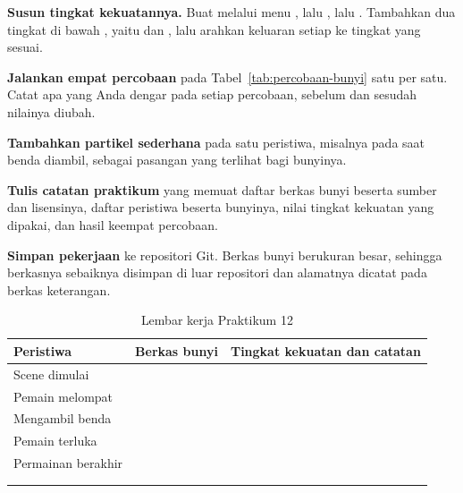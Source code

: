 \begin{praktikumbox}
\begin{langkah}
  \item \textbf{Susun tingkat kekuatannya.} Buat  melalui
        menu , lalu , lalu
        . Tambahkan dua tingkat di bawah ,
        yaitu  dan , lalu arahkan keluaran setiap
         ke tingkat yang sesuai.

  \item \textbf{Jalankan empat percobaan} pada
        Tabel~\ref{tab:percobaan-bunyi} satu per satu. Catat apa yang Anda
        dengar pada setiap percobaan, sebelum dan sesudah nilainya diubah.

  \item \textbf{Tambahkan partikel sederhana} pada satu peristiwa, misalnya
        pada saat benda diambil, sebagai pasangan yang terlihat bagi bunyinya.

  \item \textbf{Tulis catatan praktikum} yang memuat daftar berkas bunyi
        beserta sumber dan lisensinya, daftar peristiwa beserta bunyinya,
        nilai tingkat kekuatan yang dipakai, dan hasil keempat percobaan.

  \item \textbf{Simpan pekerjaan} ke repositori Git. Berkas bunyi berukuran
        besar, sehingga berkasnya sebaiknya disimpan di luar repositori dan
        alamatnya dicatat pada berkas keterangan.
\end{langkah}
\end{praktikumbox}

\begin{table}[htbp]
\centering
\caption{Lembar kerja Praktikum 12}
\label{tab:lembar-praktikum-12}
{\setlength{\tabcolsep}{4pt}\footnotesize%
\begin{tabularx}{\textwidth}{@{}L{3.6cm} L{3.4cm} Y@{}}
\toprule
\headrow \textbf{Peristiwa} & \textbf{Berkas bunyi} & \textbf{Tingkat kekuatan dan catatan} \\
\midrule
Scene dimulai & & \\[1.4em]
\midrule
Pemain melompat & & \\[1.4em]
\midrule
Mengambil benda & & \\[1.4em]
\midrule
Pemain terluka & & \\[1.4em]
\midrule
Permainan berakhir & & \\[1.4em]
\midrule
\addlinespace
{} \\[1.4em]
\addlinespace
{} \\[1.8em]
\bottomrule
\end{tabularx}}
\end{table}

